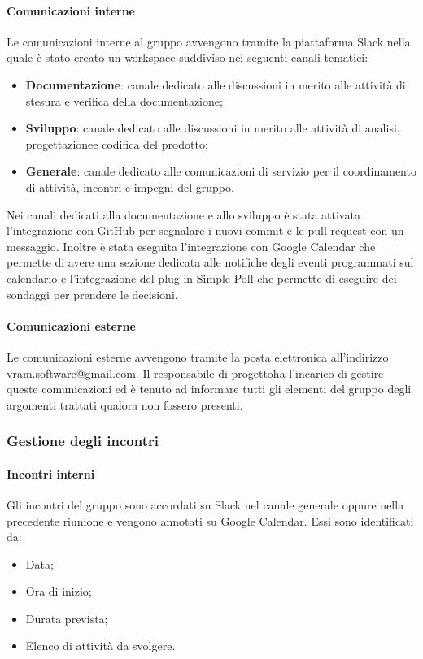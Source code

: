 			\paragraph*{Comunicazioni interne}
				Le comunicazioni interne al gruppo avvengono tramite la piattaforma Slack nella quale è stato creato un workspace suddiviso nei seguenti canali tematici:
				\begin{itemize}
					\item \textbf{Documentazione}: canale dedicato alle discussioni in merito alle attività di stesura e verifica della documentazione;
					\item \textbf{Sviluppo}: canale dedicato alle discussioni in merito alle attività di analisi, progettazione\glosp e codifica del prodotto\glo;
					\item \textbf{Generale}: canale dedicato alle comunicazioni di servizio per il coordinamento di attività, incontri e impegni del gruppo.
				\end{itemize}
				Nei canali dedicati alla documentazione e allo sviluppo è stata attivata l'integrazione con GitHub per segnalare i nuovi commit e le pull request con un messaggio.
				Inoltre è stata eseguita l'integrazione con Google Calendar che permette di avere una sezione dedicata alle notifiche degli eventi programmati sul calendario e l'integrazione del plug-in Simple Poll che permette di eseguire dei sondaggi per prendere le decisioni.
			\paragraph*{Comunicazioni esterne}
				Le comunicazioni esterne avvengono tramite la posta elettronica all'indirizzo \url{vram.software@gmail.com}.
				Il responsabile di progetto\glosp ha l'incarico di gestire queste comunicazioni ed è tenuto ad informare tutti gli elementi del gruppo degli argomenti trattati qualora non fossero presenti.
		\subsubsection{Gestione degli incontri}
			\paragraph*{Incontri interni}
				Gli incontri del gruppo sono accordati su Slack nel canale generale oppure nella precedente riunione e vengono annotati su Google Calendar. Essi sono identificati da:
				\begin{itemize}
					\item Data;
					\item Ora di inizio;
					\item Durata prevista;
					\item Elenco di attività da svolgere.
				\end{itemize}
